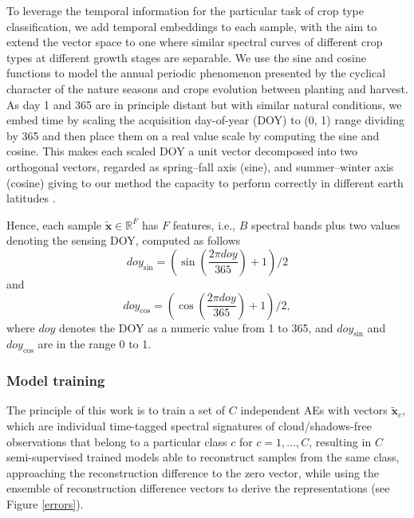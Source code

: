\documentclass[journal,article,submit,pdftex,moreauthors]{Definitions/mdpi}
\begin{document}
To leverage the temporal information for the particular task of crop type classification, we add temporal embeddings to each sample, with the aim to extend the vector space to one where similar spectral curves of different crop types at different growth stages are separable. 
We use the sine and cosine functions to model the annual periodic phenomenon presented by the cyclical character of the nature seasons and crops evolution between planting and harvest. As day 1 and 365 are in principle distant but with similar natural conditions, we embed time by scaling the acquisition day-of-year (\ac{DOY}) to (0, 1) range dividing by 365 and then place them on a real value scale by computing the sine and cosine. This makes each scaled \ac{DOY} a unit vector decomposed into two orthogonal vectors, regarded as spring–fall axis (sine), and summer–winter axis (cosine) giving to our method the capacity to perform correctly in different earth latitudes \cite{Dahlin2016}.

Hence, each sample $\mathbf{\tilde{x}} \in \mathbb{R}^F$
has $F$ features, i.e., $B$ spectral bands plus two values denoting the sensing \ac{DOY}, computed as follows
\begin{equation}
	doy_{\sin} = \left(\sin\left(\frac{2\pi doy}{365}\right)+1\right)/2
\end{equation}
and
\begin{equation}
	doy_{\cos} = \left(\cos\left(\frac{2\pi doy}{365}\right)+1\right)/2, 
\end{equation}
where $doy$ denotes the \ac{DOY} as a numeric value from 1 to 365, and $doy_{\sin}$ and $doy_{\cos}$ are in the range 0 to 1.

\subsubsection{Model training}\label{training}
The principle of this work is to train a set of $C$ independent AEs with vectors $\mathbf{\tilde{x}}_c$, which are individual time-tagged spectral signatures of cloud/shadows-free observations that belong to a particular class $c$ for $c=1,\dots,C$,  resulting in $C$ semi-supervised trained models able to reconstruct samples from the same class, approaching the reconstruction difference to the zero vector, while using the ensemble of reconstruction difference vectors to derive the representations (see Figure \ref{errors}).
\end{document}
